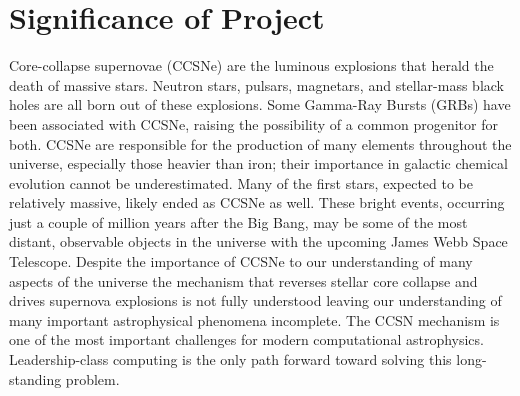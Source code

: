 \section{Significance of Project}

Core-collapse supernovae (CCSNe) are the luminous explosions that herald the death of massive stars.  
Neutron stars, pulsars, magnetars, and stellar-mass black holes are all born out of these explosions.  
Some Gamma-Ray Bursts (GRBs) have been associated with CCSNe, raising the possibility of a common progenitor for both.  
CCSNe are responsible for the production of many elements throughout the universe, especially those heavier than iron; their importance in galactic chemical evolution cannot be underestimated.  
Many of the first stars, expected to be relatively massive, likely ended as CCSNe as well.  
These bright events, occurring just a couple of million years after the Big Bang, may be some of the most distant, observable objects in the universe with the upcoming James Webb Space Telescope.  
Despite the importance of CCSNe to our understanding of many aspects of the universe the mechanism that reverses stellar core collapse and drives supernova explosions is not fully understood leaving our understanding of many important astrophysical phenomena incomplete.  
The CCSN mechanism is one of the most important challenges for modern computational astrophysics.  
Leadership-class computing is the only path forward toward solving this long-standing problem.

